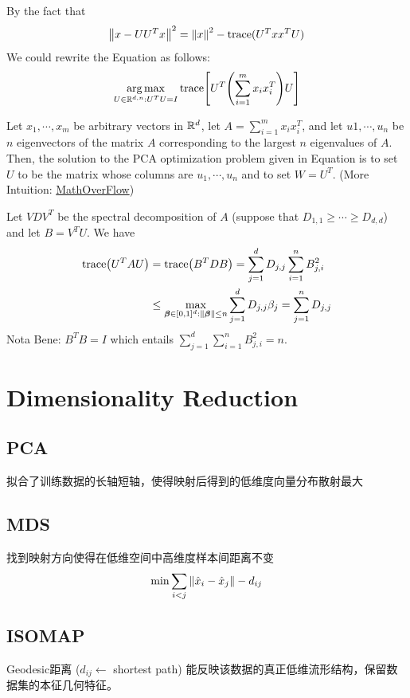 \documentclass[a4paper,landscape]{article}
\begin{document}
\begin{tiny}
\begin{multicols}{4}
		By the fact that
		\[
			\norm{x-UU^Tx}^2=\norm{x}^2-\mathrm{trace}(U^Txx^TU)
		\] We could rewrite the Equation as follows:
		\[
			\mathop{\arg\max}_{U\in\mathbb{R}^{d,n}:U^TU=I}\mathrm{trace}\qty[U^T \qty(\sum^{m}_{i=1}x_ix_i^T) U]
		\]
		\begin{thm}
			Let $x_1,\cdots, x_m$ be arbitrary vectors in $\mathbb{R}^d$,
			let $A = \sum^{m}_{i=1}  x_ix_i^T$,
			and let $u1,\cdots, u_n$ be $n$ eigenvectors of the matrix $A$ corresponding to the largest $n$ eigenvalues of $A$.
			Then, the solution to the PCA optimization problem given in Equation is to set $U$ to be the matrix whose columns are $u_1,\cdots,u_n$ and to set $W = U^T$.
			(More Intuition: \href{https://mathoverflow.net/questions/248198/maximizing-trace-of-mathrm-vt-mathrm-a-mathrm-v-for-mathrm-a-symmetric}{MathOverFlow})
		\end{thm}
		\begin{prf}
			Let $VDV^T$ be the spectral decomposition of  $A$ (suppose that $D_{1,1}\ge \cdots\ge D_{d,d}$) and let $B=V^TU$. We have
			\[
				\begin{aligned}
					\mathrm{trace}\qty(U^TAU)
					 & =
					\mathrm{trace}\qty(B^TDB)
					=
					\sum^{d}_{j=1} D_{j,j}\sum^{n}_{i=1} B^2_{j,i}
					\\&\le
					\max_{\boldsymbol{\beta}\in[0,1]^d:\norm{\boldsymbol{\beta}}\le n}\sum^{d}_{j=1} D_{j,j}\beta_j
					=
					\sum^{n}_{j=1} D_{j,j}
				\end{aligned}
			\]
			Nota Bene: $B^TB=I$ which entails  $ \sum^{d}_{j=1} \sum^{n}_{i=1} B^2_{j,i}=n $.
		\end{prf}

		\section{Dimensionality Reduction}

		\subsection{PCA}
		拟合了训练数据的长轴短轴，使得映射后得到的低维度向量分布散射最大
		
		\subsection{MDS}
		找到映射方向使得在低维空间中高维度样本间距离不变
		\[
			\min \sum_{i<j}\norm{\hat{x}_i-\hat{x}_j}-d_{ij}
		\]

		\subsection{ISOMAP}
		Geodesic距离 ($d_{ij}\gets$ shortest path) 能反映该数据的真正低维流形结构，保留数据集的本征几何特征。


\end{multicols}
\end{tiny}
\end{document}
